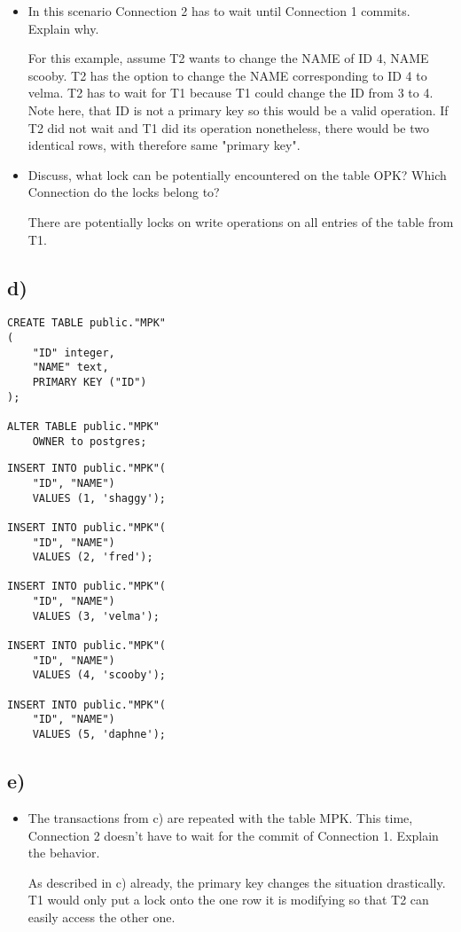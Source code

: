 \documentclass[ngerman]{dis-template-add}
\begin{document}
\begin{itemize}
\item In this scenario Connection 2 has to wait until Connection 1 commits. Explain why.

For this example, assume T2 wants to change the NAME of ID 4, NAME scooby.
T2 has the option to change the NAME corresponding to ID 4 to velma. 
T2 has to wait for T1 because T1 could change the ID from 3 to 4. Note here, that ID is not a primary key so this would be a valid operation.
If T2 did not wait and T1 did its operation nonetheless, there would be two identical rows, with therefore same "primary key".

\item Discuss, what lock can be potentially encountered on the table OPK? Which Connection do the locks belong to?

There are potentially locks on write operations on all entries of the table from T1.

\end{itemize}

\subsection*{d)}

\begin{verbatim}
CREATE TABLE public."MPK"
(
    "ID" integer,
    "NAME" text,
    PRIMARY KEY ("ID")
);

ALTER TABLE public."MPK"
    OWNER to postgres;
\end{verbatim}

\begin{verbatim}
INSERT INTO public."MPK"(
    "ID", "NAME")
    VALUES (1, 'shaggy');

INSERT INTO public."MPK"(
    "ID", "NAME")
    VALUES (2, 'fred');
	
INSERT INTO public."MPK"(
    "ID", "NAME")
    VALUES (3, 'velma');
	
INSERT INTO public."MPK"(
    "ID", "NAME")
    VALUES (4, 'scooby');
	
INSERT INTO public."MPK"(
    "ID", "NAME")
    VALUES (5, 'daphne');
\end{verbatim}


\subsection*{e)}
\begin{itemize}

\item The transactions from c) are repeated with the table MPK. This time, Connection 2 doesn't have to wait for the commit of Connection 1. Explain the behavior.

As described in c) already, the primary key changes the situation drastically.
T1 would only put a lock onto the one row it is modifying so that T2 can easily access the other one.
\end{itemize}
\end{document}
